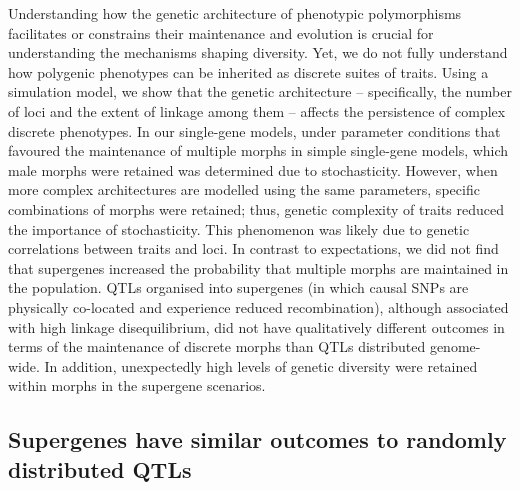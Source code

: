 \documentclass[
  11pt,
  a4paper,
]{article}
\begin{document}
Understanding how the genetic architecture of phenotypic polymorphisms
facilitates or constrains their maintenance and evolution is crucial for
understanding the mechanisms shaping diversity. Yet, we do not fully
understand how polygenic phenotypes can be inherited as discrete suites
of traits. Using a simulation model, we show that the genetic
architecture -- specifically, the number of loci and the extent of
linkage among them -- affects the persistence of complex discrete
phenotypes. In our single-gene models, under parameter conditions that
favoured the maintenance of multiple morphs in simple single-gene
models, which male morphs were retained was determined due to
stochasticity. However, when more complex architectures are modelled
using the same parameters, specific combinations of morphs were
retained; thus, genetic complexity of traits reduced the importance of
stochasticity. This phenomenon was likely due to genetic correlations
between traits and loci. In contrast to expectations, we did not find
that supergenes increased the probability that multiple morphs are
maintained in the population. QTLs organised into supergenes (in which
causal SNPs are physically co-located and experience reduced
recombination), although associated with high linkage disequilibrium,
did not have qualitatively different outcomes in terms of the
maintenance of discrete morphs than QTLs distributed genome-wide. In
addition, unexpectedly high levels of genetic diversity were retained
within morphs in the supergene scenarios.

\hypertarget{supergenes-have-similar-outcomes-to-randomly-distributed-qtls}{%
\subsection{Supergenes have similar outcomes to randomly distributed QTLs}\label{supergenes-have-similar-outcomes-to-randomly-distributed-qtls}}
\end{document}
